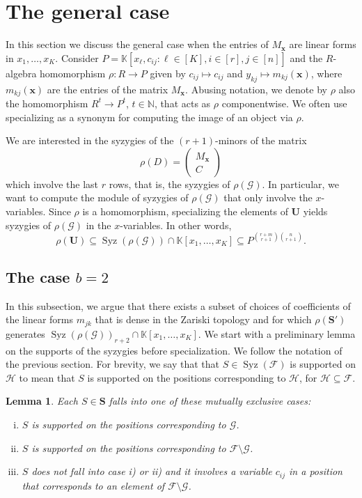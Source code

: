 \documentclass[utf8,latin1]{article}
\newtheorem{lemma}[theorem]{Lemma}
\DeclareMathOperator{\Syz}{Syz}
\newcommand{\KK}{\mathbb{K}}
\renewcommand{\vec}[1]{\ensuremath{ \mathbf #1 }}
\begin{document}
\section{The general case}\label{sect:spec}

In this section we discuss the general case when the entries of $M_{\vec{x}}$ are linear forms in $x_1,\ldots,x_K$. 
Consider $P=\KK[x_\ell,c_{ij}: \ell\in[K], i\in[r], j\in[n]]$ and the $R$-algebra homomorphism $\rho:R\rightarrow P$ given by $c_{ij}\mapsto c_{ij}$ and $y_{kj}\mapsto m_{kj}(\vec{x})$, where $m_{kj}(\vec{x})$ are the entries of the matrix $M_{\vec{x}}$. Abusing notation, we denote by $\rho$ also the homomorphism $R^t \rightarrow P^t$, $t \in \mathbb{N}$, that acts as $\rho$ componentwise. We often use specializing as a synonym for computing the image of an object via $\rho$. 

We are interested in the syzygies of the $(r+1)$-minors of the matrix $$\rho(D)=\begin{pmatrix}
	M_{\vec{x}} \\
	C
\end{pmatrix}$$ 
which involve the last $r$ rows, that is, the syzygies of $\rho(\mathcal{G})$. In particular, we want to compute the module of syzygies of $\rho(\mathcal{G})$ that only involve the $x$-variables.
Since $\rho$ is a homomorphism, specializing the elements of $\mathbf{U}$ yields syzygies of $\rho(\mathcal{G})$ in the $x$-variables.
In other words,
$$\rho(\mathbf{U}) \subseteq \Syz(\rho(\mathcal{G}))\cap\mathbb{K}[x_1,\ldots,x_K] \subseteq P^{\binom{r+m}{r+1} \binom{n}{r+1}}.$$


\subsection{The case $b=2$}

In this subsection, we argue that there exists a subset of choices of coefficients of the linear forms $m_{jk}$ that is dense in the Zariski topology and for which $\rho(\mathbf{S}')$ generates $\Syz(\rho(\mathcal{G}))_{r+2}\cap\mathbb{K}[x_1,\ldots,x_K]$.
We start with a preliminary lemma on the supports of the syzygies before specialization. We follow the notation of the previous section. 
For brevity, we say that that $S\in\Syz(\mathcal{F})$ is supported on $\mathcal{H}$ to mean that $S$ is supported on the positions corresponding to $\mathcal{H}$, for $\mathcal{H}\subseteq\mathcal{F}$.

\begin{lemma}\label{lemma:supp}
Each $S\in \mathbf{S}$ falls into one of these mutually exclusive cases:
\begin{enumerate}[i)]
\item $S$ is supported on the positions corresponding to $\mathcal{G}$.
\item $S$ is supported on the positions corresponding to $\mathcal{F}\setminus \mathcal{G}$.
\item $S$ does not fall into case i) or ii) and it involves a variable $c_{ij}$ in a position that corresponds to an element of $\mathcal{F}\setminus \mathcal{G}$.
\end{enumerate}  
\end{lemma}
\end{document}
